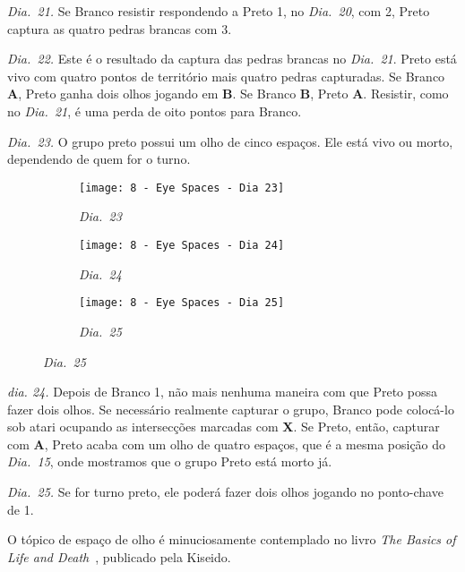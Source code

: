 \emph{Dia.\@~21.} Se Branco resistir respondendo a Preto 1, no \emph{Dia.\@~20}, com 2, Preto captura as quatro pedras brancas com 3.

\emph{Dia.\@~22.} Este é o resultado da captura das pedras brancas no \emph{Dia.\@~21}. Preto está vivo com quatro pontos de território mais quatro pedras capturadas. Se Branco \textbf{A}, Preto ganha dois olhos jogando em \textbf{B}. Se Branco \textbf{B}, Preto \textbf{A}. Resistir, como no \emph{Dia.\@~21}, é uma perda de oito pontos para Branco.

\emph{Dia.\@~23.} O grupo preto possui um olho de cinco espaços. Ele está vivo ou morto, dependendo de quem for o turno.

\begin{figure}[h!]
    \centering
    \begin{subfigure}[t]{.31\textwidth}
        \texttt{[image: 8 - Eye Spaces - Dia 23]}
        \captionsetup{justification=centering}
        \caption*{\emph{Dia.\@~23}}
    \end{subfigure}
    \hfill
    \begin{subfigure}[t]{.31\textwidth}
        \texttt{[image: 8 - Eye Spaces - Dia 24]}
        \captionsetup{justification=centering}
        \caption*{\emph{Dia.\@~24}}
    \end{subfigure}
    \hfill
    \begin{subfigure}[t]{.31\textwidth}
        \texttt{[image: 8 - Eye Spaces - Dia 25]}
        \captionsetup{justification=centering}
        \caption*{\emph{Dia.\@~25}}
    \end{subfigure}
\end{figure}

\emph{dia. 24.} Depois de Branco 1, não mais nenhuma maneira com que Preto possa fazer dois olhos. Se necessário realmente capturar o grupo, Branco pode colocá-lo sob atari ocupando as intersecções marcadas com \textbf{X}. Se Preto, então, capturar com \textbf{A}, Preto acaba com um olho de quatro espaços, que é a mesma posição do \emph{Dia.\@~15}, onde mostramos que o grupo Preto está morto já.

\emph{Dia.\@~25.} Se for turno preto, ele poderá fazer dois olhos jogando no ponto-chave de 1.

O tópico de espaço de olho é minuciosamente contemplado no livro \emph{The Basics of Life and Death}~\cite{zeijst_bozulich_basics_of_life_and_death}, publicado pela Kiseido.